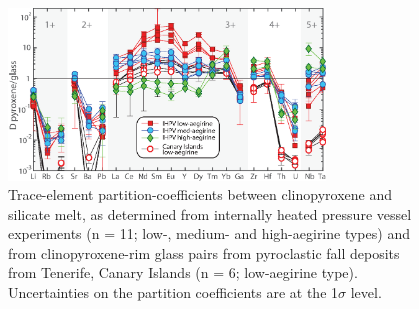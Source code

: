 \documentclass[review,authoryear,12pt]{elsarticle}
\begin{document}
        \begin{figure}[tb]
        \begin{center}
        \includegraphics[width=0.75\textwidth]{6_Px_D_Spider_Apr2018.eps}
        \caption[Extended trace-element-partitioning diagram for clinopyroxene/melt]{Trace-element partition-coefficients between clinopyroxene and silicate melt, as determined from internally heated pressure vessel experiments (n = 11; low-, medium- and high-aegirine types) and from clinopyroxene-rim glass pairs from pyroclastic fall deposits from Tenerife, Canary Islands (n = 6; low-aegirine type). Uncertainties on the partition coefficients are at the 1$\sigma$ level.}
        \label{6_D_Spider}
        \end{center}
        \end{figure}
\end{document}
